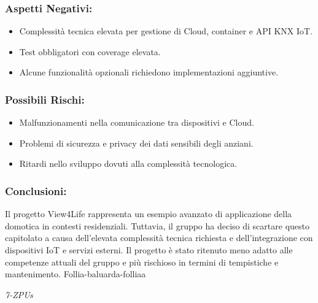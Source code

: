 \documentclass[a4paper,12pt]{article}
\begin{document}
\subsubsection*{Aspetti Negativi:}
\begin{itemize}
    \item Complessità tecnica elevata per gestione di Cloud, container e API KNX IoT.
    \item Test obbligatori con coverage elevata.
    \item Alcune funzionalità opzionali richiedono implementazioni aggiuntive.
\end{itemize}

\subsubsection*{Possibili Rischi:}
\begin{itemize}
    \item Malfunzionamenti nella comunicazione tra dispositivi e Cloud.
    \item Problemi di sicurezza e privacy dei dati sensibili degli anziani.
    \item Ritardi nello sviluppo dovuti alla complessità tecnologica.
\end{itemize}

\subsubsection*{Conclusioni:}
Il progetto View4Life rappresenta un esempio avanzato di applicazione della domotica in contesti residenziali. Tuttavia, il gruppo ha deciso di scartare questo capitolato a causa dell'elevata complessità tecnica richiesta e dell'integrazione con dispositivi IoT e servizi esterni. Il progetto è stato ritenuto meno adatto alle competenze attuali del gruppo e più rischioso in termini di tempistiche e mantenimento.
Follia-baluarda-folliaa
\vspace{0.5cm}

\vfill
\begin{flushright}
    \textit{7-ZPUs}
\end{flushright}
\end{document}
